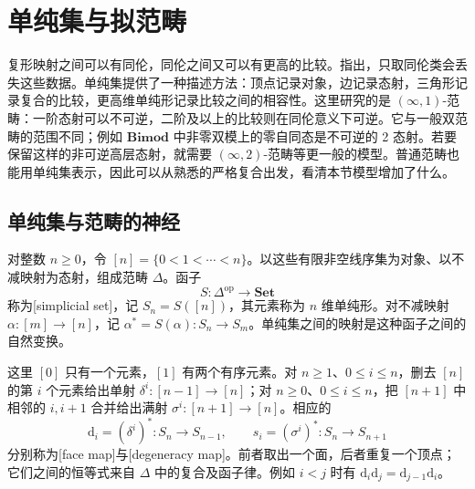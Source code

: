 
\section{单纯集与拟范畴}
\label{b4:sec:F04}

复形映射之间可以有同伦，同伦之间又可以有更高的比较。指出，只取同伦类会丢失这些数据。单纯集提供了一种描述方法：顶点记录对象，边记录态射，三角形记录复合的比较，更高维单纯形记录比较之间的相容性。这里研究的是 \((\infty,1)\)-范畴：一阶态射可以不可逆，二阶及以上的比较则在同伦意义下可逆。它与一般双范畴的范围不同；例如 \(\mathbf{Bimod}\) 中非零双模上的零自同态是不可逆的 2 态射。若要保留这样的非可逆高层态射，就需要 \((\infty,2)\)-范畴等更一般的模型。普通范畴也能用单纯集表示，因此可以从熟悉的严格复合出发，看清本节模型增加了什么。

\subsection{单纯集与范畴的神经}
\label{b4:subsec:F04:01}

\begin{definition}\label{b4:def:F-simplicial-set}
	对整数 \(n\ge0\)，令 \([n]=\{0<1<\cdots<n\}\)。以这些有限非空线序集为对象、以不减映射为态射，组成范畴 \(\Delta\)。函子
	\[
		S:\Delta^{\mathrm{op}}\longrightarrow\mathbf{Set}
	\]
	称为[simplicial set]，记 \(S_n=S([n])\)，其元素称为 \(n\) 维单纯形。对不减映射 \(\alpha:[m]\rightarrow[n]\)，记 \(\alpha^*=S(\alpha):S_n\rightarrow S_m\)。单纯集之间的映射是这种函子之间的自然变换。
\end{definition}

这里 \([0]\) 只有一个元素，\([1]\) 有两个有序元素。对 \(n\ge1\)、\(0\le i\le n\)，删去 \([n]\) 的第 \(i\) 个元素给出单射 \(\delta^i:[n-1]\rightarrow[n]\)；对 \(n\ge0\)、\(0\le i\le n\)，把 \([n+1]\) 中相邻的 \(i,i+1\) 合并给出满射 \(\sigma^i:[n+1]\rightarrow[n]\)。相应的
\[
	\mathrm d_i=(\delta^i)^*:S_n\longrightarrow S_{n-1}, \qquad s_i=(\sigma^i)^*:S_n\longrightarrow S_{n+1}
\]
分别称为[face map]与[degeneracy map]。前者取出一个面，后者重复一个顶点；它们之间的恒等式来自 \(\Delta\) 中的复合及函子律。例如 \(i<j\) 时有 \(\mathrm d_i\mathrm d_j=\mathrm d_{j-1}\mathrm d_i\)。

